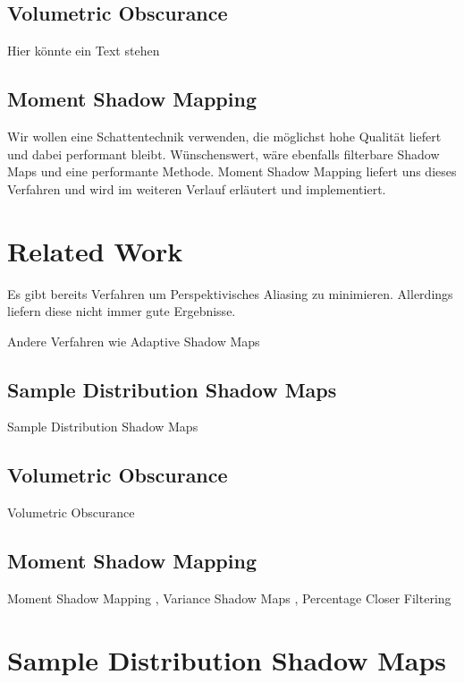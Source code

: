 \documentclass[runningheaders,a4paper]{llncs}
\begin{document}
\subsection{Volumetric Obscurance}
Hier könnte ein Text stehen


\subsection{Moment Shadow Mapping}
Wir wollen eine Schattentechnik verwenden, die möglichst hohe Qualität liefert und dabei performant bleibt. Wünschenswert, wäre ebenfalls filterbare Shadow Maps und eine performante Methode. Moment Shadow Mapping liefert uns dieses Verfahren und wird im weiteren Verlauf erläutert und implementiert.



\section{Related Work}

Es gibt bereits Verfahren \cite{CSM} \cite{PSSM} um Perspektivisches Aliasing zu minimieren.
Allerdings liefern diese nicht immer gute Ergebnisse.

Andere Verfahren wie Adaptive Shadow Maps \cite{asm}


\subsection{Sample Distribution Shadow Maps}

Sample Distribution Shadow Maps \cite{sdsm}


\subsection{Volumetric Obscurance}

Volumetric Obscurance \cite{loos2010volumetric}


\subsection{Moment Shadow Mapping}

Moment Shadow Mapping \cite{msm}, Variance Shadow Maps \cite{donnelly2006variance}, Percentage Closer Filtering \cite{reeves1987rendering}



\section{Sample Distribution Shadow Maps}
\end{document}
